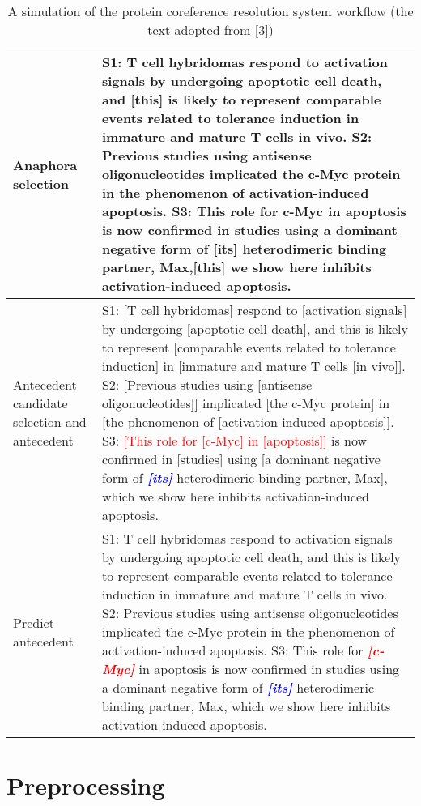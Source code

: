 \begin{table}
\begin{tabular}{ m{20mm} m{113mm} }
	\hline
	\footnotesize{Anaphora selection} & \footnotesize{S1: T cell hybridomas respond to activation signals by undergoing apoptotic cell death, and \textbf{[this]} is likely to represent comparable events related to tolerance induction in immature and mature T cells in vivo. S2: Previous studies using antisense oligonucleotides implicated the c-Myc protein in the phenomenon of activation-induced apoptosis. S3: This role for c-Myc in apoptosis is now confirmed in studies using a dominant negative form of \textbf{[its]} heterodimeric binding partner, Max,[this] we show here inhibits activation-induced apoptosis.}\\
	\hline
	\footnotesize{Antecedent candidate selection and antecedent}& \footnotesize{S1: [T cell hybridomas] respond to [activation signals] by undergoing [apoptotic cell death], and this is likely to represent [comparable events related to tolerance induction] in [immature and mature T cells [in vivo]]. S2: [Previous studies using [antisense oligonucleotides]] implicated [the c-Myc protein] in [the phenomenon of [activation-induced apoptosis]]. S3: \textcolor{red}{[This role for [c-Myc] in [apoptosis]]} is now confirmed in [studies] using [a dominant negative form of \textcolor{blue}{\textbf{\textit{[its]}}} heterodimeric binding partner, Max], which we show here inhibits activation-induced apoptosis.}\\
	\hline
	\footnotesize{Predict antecedent}&\footnotesize{S1: T cell hybridomas respond to activation signals by undergoing apoptotic cell death, and this is likely to represent comparable events related to tolerance induction in immature and mature T cells in vivo. S2: Previous studies using antisense oligonucleotides implicated the c-Myc protein in the phenomenon of activation-induced apoptosis. S3: This role for \textcolor{red}{\emph{\textbf{[c-Myc]}}} in apoptosis is now confirmed in studies using a dominant negative form of \textcolor{blue}{\emph{\textbf{[its]}}} heterodimeric binding partner, Max, which we show here inhibits activation-induced apoptosis.}
  \end{tabular}
  \caption[A simulation of the protein coreference resolution system]{A simulation of the protein coreference resolution system workflow (the text adopted from [3])}
\end{table}

\newpage
\section{Preprocessing}

